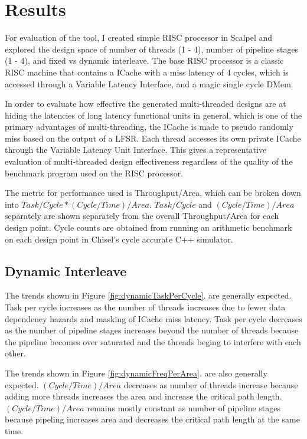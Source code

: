 \section{Results}
For evaluation of the tool, I created simple RISC processor in Scalpel and explored the design space of number of threads (1 - 4), number of pipeline stages (1 - 4), and fixed vs dynamic interleave. The base RISC processor is a classic RISC machine that contains a ICache with a miss latency of 4 cycles, which is accessed through a Variable Latency Interface, and a magic single cycle DMem. 

In order to evaluate how effective the generated multi-threaded designs are at hiding the latencies of long latency functional units in general, which is one of the primary advantages of multi-threading, the ICache is made to pseudo randomly miss based on the output of a LFSR. Each thread accesses its own private ICache through the Variable Latency Unit Interface. This gives a representative evaluation of multi-threaded design effectiveness regardless of the quality of the benchmark program used on the RISC processor.

The metric for performance used is Throughput/Area, which can be broken down into $Task/Cycle * (Cycle/Time)/Area$. $Task/Cycle$ and $(Cycle/Time)/Area$ separately are shown separately from the overall Throughput{\tt /}Area for each design point. Cycle counts are obtained from running an arithmetic benchmark on each design point in Chisel's cycle accurate C++ simulator.

\subsection{Dynamic Interleave}
The trends shown in Figure \ref{fig:dynamicTaskPerCycle}. are generally expected. Task per cycle increases as the number of threads increases due to fewer data dependency hazards and masking of ICache miss latency. Task per cycle decreases as the number of pipeline stages increases beyond the number of threads because the pipeline becomes over saturated and the threads beging to interfere with each other.

The trends shown in Figure \ref{fig:dynamicFreqPerArea}. are also generally expected. $(Cycle/Time)/Area$ decreases as number of threads increase because adding more threads increases the area and increase the critical path length. $(Cycle/Time)/Area$ remains mostly constant as number of pipeline stages because pipeling increases area and decreases the critical path length at the same time.

